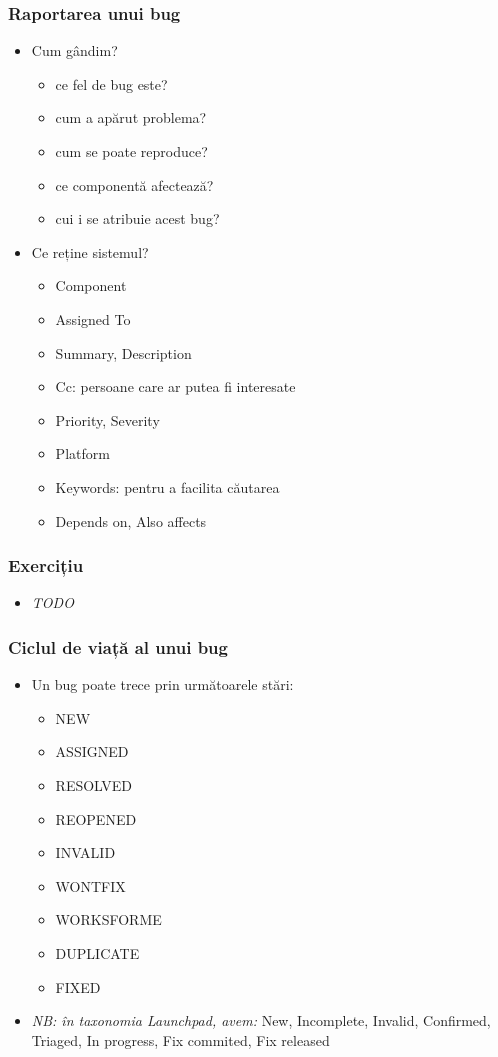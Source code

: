 \documentclass{beamer}
\begin{document}
\begin{frame}
\frametitle{Raportarea unui bug}
\begin{itemize}
\item Cum gândim?
\begin{itemize}
\pause \item ce fel de bug este?
\pause \item cum a apărut problema?
\pause \item cum se poate reproduce?
\pause \item ce componentă afectează?
\pause \item cui i se atribuie acest bug? %
\end{itemize}
\pause \item Ce reține sistemul?
\begin{itemize}
\item Component
\item Assigned To
\item Summary, Description
\item Cc: persoane care ar putea fi interesate
\item Priority, Severity
\item Platform
\item Keywords: pentru a facilita căutarea
\item Depends on, Also affects
\end{itemize}
\end{itemize}
\end{frame}

\begin{frame}
\frametitle{Exercițiu}
\begin{itemize}
\item \emph{TODO}
\end{itemize}
\end{frame}

\begin{frame}
\frametitle{Ciclul de viață al unui bug}
\begin{itemize}
\item Un bug poate trece prin următoarele stări:
\begin{itemize}
\item NEW
\item ASSIGNED
\item RESOLVED
\item REOPENED
\item INVALID
\item WONTFIX
\item WORKSFORME
\item DUPLICATE
\item FIXED
\end{itemize}
\pause \item \emph{NB: în taxonomia Launchpad, avem:} New, Incomplete, Invalid, Confirmed, Triaged, In progress, Fix commited, Fix released
\end{itemize}
\end{frame}
\end{document}
